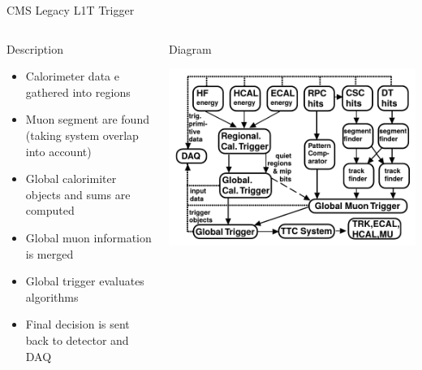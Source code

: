\documentclass[8pt]{beamer}
\begin{document}
\begin{frame}{CMS Legacy L1T Trigger}
 
\begin{columns}
    
  \column[t]{5.5cm}  
  \begin{block}{Description}
 
    \begin{itemize}
      \item Calorimeter data e gathered into regions
      \item Muon segment are found (taking system overlap into account)
      \item Global calorimiter objects and sums are computed
      \item Global muon information is merged
      \item Global trigger evaluates algorithms
      \item Final decision is sent back to detector and DAQ
    \end{itemize}
   
  \end{block}
   
  \column[t]{5.5cm}
  \begin{block}{Diagram} 
  
    \includegraphics[width=1.00\textwidth]{img/L1TLegacyDiagram.png} 
 
  \end{block}

\end{columns}

\end{frame}
\end{document}
